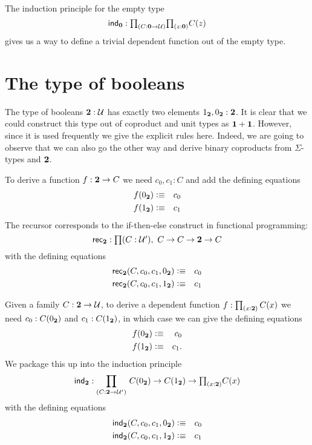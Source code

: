 The induction principle for the empty type
\[ \ind{\emptyt} : \tprd{C:\emptyt \to \UU}{z:\emptyt} C(z) \]
gives us a way to define a trivial dependent function out of the
empty type. %

\section{The type of booleans}
\label{sec:type-booleans}

The type of booleans $\mathbf{2}:\mathcal{U}$ has exactly two elements 
${1_{\mathbf{2}}},{0_{\mathbf{2}}} : \mathbf{2}$. It is clear that we could construct this
type out of coproduct and unit types as $\mathbf{1} + \mathbf{1}$. However,
since it is used frequently we give the explicit rules here.
Indeed, we are going to observe that we can also go the other way
and derive binary coproducts from $\Sigma$-types and $\mathbf{2}$.

To derive a function $f : \mathbf{2} \to C$ we need $c_0,c_1 : C$ and
add the defining equations
\begin{eqnarray*}
  f({0_{\mathbf{2}}}) & \vcentcolon\equiv & c_0 \\
  f({1_{\mathbf{2}}}) & \vcentcolon\equiv & c_1
\end{eqnarray*}
The recursor corresponds to the if-then-else construct in
functional programming:
\[ \rec{\bool} : \prd{C:\UU'}  C \to C \to \bool \to C \]
with the defining equations
\begin{eqnarray*}
  \mathsf{rec}_{\mathbf{2}}(C,c_0,c_1,{0_{\mathbf{2}}}) & \vcentcolon\equiv & c_0 \\
  \mathsf{rec}_{\mathbf{2}}(C,c_0,c_1,{1_{\mathbf{2}}}) & \vcentcolon\equiv & c_1
\end{eqnarray*}

Given a family $C : \mathbf{2} \to \mathcal{U}$, to derive a dependent function 
$f : \prd{x:\bool}C(x)$ we need $c_0:C({0_{\mathbf{2}}})$ and $c_1 : C({1_{\mathbf{2}}})$, in which case we can give the defining equations
\begin{eqnarray*}
  f({0_{\mathbf{2}}}) & \vcentcolon\equiv & c_0 \\
  f({1_{\mathbf{2}}}) & \vcentcolon\equiv & c_1.
\end{eqnarray*}
We package this up into the induction principle
\[ \ind{\bool} : \dprd{C:\bool \to \UU'}  C(\bfalse) \to C(\btrue)
\to \tprd{x:\bool} C(x) \]
with the defining equations
\begin{eqnarray*}
  \mathsf{ind}_{\mathbf{2}}(C,c_0,c_1,{0_{\mathbf{2}}}) & \vcentcolon\equiv & c_0 \\
  \mathsf{ind}_{\mathbf{2}}(C,c_0,c_1,{1_{\mathbf{2}}}) & \vcentcolon\equiv & c_1
\end{eqnarray*}

